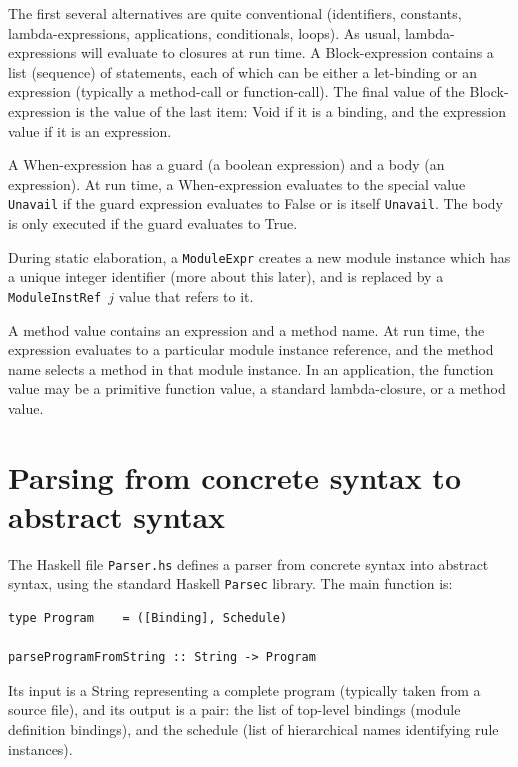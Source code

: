 \documentclass[11pt]{article}
\newcommand{\term}[1]{\texttt{#1}}
\begin{document}
The first several alternatives are quite conventional (identifiers,
constants, lambda-expressions, applications, conditionals, loops).  As
usual, lambda-expressions will evaluate to closures at run time.  A
Block-expression contains a list (sequence) of statements, each of
which can be either a let-binding or an expression (typically a
method-call or function-call).  The final value of the
Block-expression is the value of the last item: Void if it is a
binding, and the expression value if it is an expression.

A When-expression has a guard (a boolean expression) and a body (an
expression).  At run time, a When-expression evaluates to the special
value \term{Unavail} if the guard expression evaluates to False or is
itself \term{Unavail}.  The body is only executed if the guard
evaluates to True.

During static elaboration, a \term{ModuleExpr} creates a new module
instance which has a unique integer identifier (more about this
later), and is replaced by a \term{ModuleInstRef~$j$} value that
refers to it.

A method value contains an expression and a method name.  At run time,
the expression evaluates to a particular module instance reference,
and the method name selects a method in that module instance.  In an
application, the function value may be a primitive function value, a
standard lambda-closure, or a method value.


\section{Parsing from concrete syntax to abstract syntax}

\label{sec_parsing}

The Haskell file {\tt Parser.hs} defines a parser from concrete syntax
into abstract syntax, using the standard Haskell \term{Parsec}
library.  The main function is:

\begin{Verbatim}[frame=single, commandchars=\\\{\}]
type Program    = ([Binding], Schedule)

parseProgramFromString :: String -> Program
\end{Verbatim}

Its input is a String representing a complete program (typically taken
from a source file), and its output is a pair: the list of top-level
bindings (module definition bindings), and the schedule (list of
hierarchical names identifying rule instances).
\end{document}
